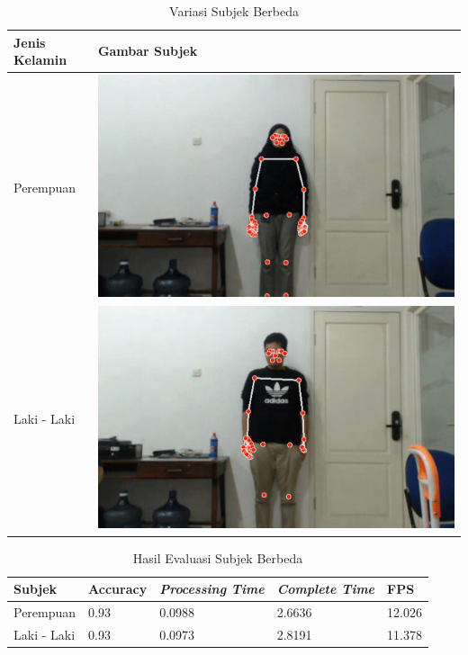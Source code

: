 \begin{table}[H]
  \caption{Variasi Subjek Berbeda}
  \label{tb:kondisisubjek}
  \centering
  \begin{tabular}{ll}
    \hline
    \textbf{Jenis Kelamin} & \textbf{Gambar Subjek} \\
    \hline
    Perempuan & \includegraphics[scale=0.12]{gambar/bab4-rani.png} \\
    \hline
    Laki - Laki & \includegraphics[scale=0.12]{gambar/bab4-evan.png} \\
    \hline
  \end{tabular}
\end{table}

\begin{table}[H]
  \caption{Hasil Evaluasi Subjek Berbeda}
  \label{tb:evaluasiSubjek}
  \centering
  \begin{tabular}{lllll}
    \hline
    \textbf{Subjek} & \textbf{Accuracy} & \emph{\textbf{Processing Time}} & \emph{\textbf{Complete Time}} & \textbf{FPS}\\
    \hline
    Perempuan & 0.93 & 0.0988 & 2.6636   & 12.026\\
    Laki - Laki & 0.93 & 0.0973 & 2.8191 & 11.378\\
    \hline
  \end{tabular}
\end{table}

